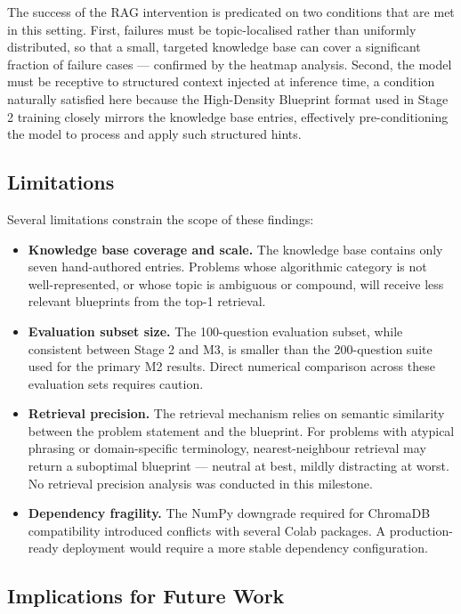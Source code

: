 \documentclass[12pt,a4paper]{article}
\begin{document}
The success of the RAG intervention is predicated on two conditions that are met in this setting. First, failures must be topic-localised rather than uniformly distributed, so that a small, targeted knowledge base can cover a significant fraction of failure cases --- confirmed by the heatmap analysis. Second, the model must be receptive to structured context injected at inference time, a condition naturally satisfied here because the High-Density Blueprint format used in Stage 2 training closely mirrors the knowledge base entries, effectively pre-conditioning the model to process and apply such structured hints.

\subsection{Limitations}

Several limitations constrain the scope of these findings:

\begin{itemize}
    \item \textbf{Knowledge base coverage and scale.} The knowledge base contains only seven hand-authored entries. Problems whose algorithmic category is not well-represented, or whose topic is ambiguous or compound, will receive less relevant blueprints from the top-1 retrieval.
    \item \textbf{Evaluation subset size.} The 100-question evaluation subset, while consistent between Stage 2 and M3, is smaller than the 200-question suite used for the primary M2 results. Direct numerical comparison across these evaluation sets requires caution.
    \item \textbf{Retrieval precision.} The retrieval mechanism relies on semantic similarity between the problem statement and the blueprint. For problems with atypical phrasing or domain-specific terminology, nearest-neighbour retrieval may return a suboptimal blueprint --- neutral at best, mildly distracting at worst. No retrieval precision analysis was conducted in this milestone.
    \item \textbf{Dependency fragility.} The NumPy downgrade required for ChromaDB compatibility introduced conflicts with several Colab packages. A production-ready deployment would require a more stable dependency configuration.
\end{itemize}

\subsection{Implications for Future Work}
\end{document}
